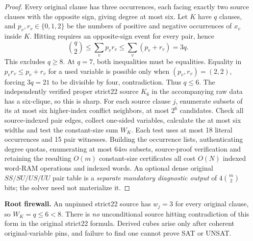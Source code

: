 \documentclass[10pt]{article}
\begin{document}
\begin{proof}
Every original clause has three occurrences, each facing exactly two source clauses with the opposite sign, giving degree at most six. Let $K$ have $q$ clauses, and $p_v,r_v\in\{0,1,2\}$ be the numbers of positive and negative occurrences of $x_v$ inside $K$. Hitting requires an opposite-sign event for every pair, hence
\[
 {q\choose2}\le\sum_vp_vr_v\le\sum_v(p_v+r_v)=3q.
\]
This excludes $q\ge8$. At $q=7$, both inequalities must be equalities. Equality in $p_vr_v\le p_v+r_v$ for a used variable is possible only when $(p_v,r_v)=(2,2)$, forcing $3q=21$ to be divisible by four, contradiction. Thus $q\le6$. The independently verified proper strict22 source $K_6$ in the accompanying raw data has a six-clique, so this is sharp. For each source clause $j$, enumerate subsets of its at most six higher-index conflict neighbors, at most $2^6$ candidates. Check all source-indexed pair edges, collect one-sided variables, calculate the at most six widths and test the constant-size sum $W_K$. Each test uses at most 18 literal occurrences and 15 pair witnesses. Building the occurrence lists, authenticating degree quotas, enumerating at most $64m$ subsets, source-proof verification and retaining the resulting $O(m)$ constant-size certificates all cost $O(N)$ indexed word-RAM operations and indexed words. An optional dense original $SS/SU/US/UU$ pair table is a \emph{separate mandatory diagnostic output} of $4{m\choose2}$ bits; the solver need not materialize it.
\end{proof}
\noindent\textbf{Root firewall.} An unpinned strict22 source has $w_j=3$ for every original clause, so $W_K=q\le6<8$. There is \emph{no} unconditional source hitting contradiction of this form in the original strict22 formula. Derived cubes arise only after coherent original-variable pins, and failure to find one cannot prove SAT or UNSAT.
\end{document}
